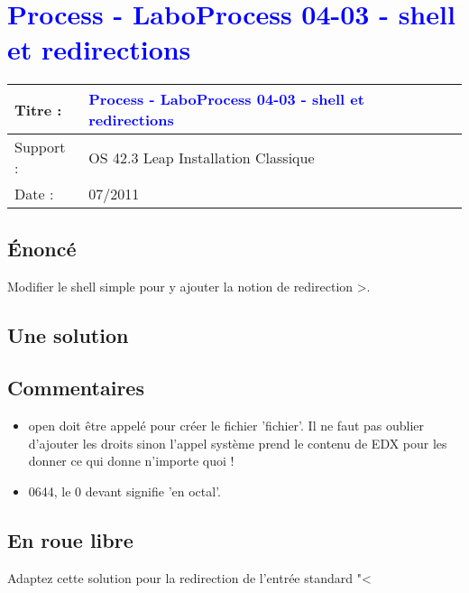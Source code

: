 \lstset{language=c}
\renewcommand{\titre}{\textcolor{blue}{ Process - LaboProcess 04-03 - shell et redirections }}

\lhead{ \titre }
\section{{\titre} }

\begin{tabular}{|l|l|}
\hline
Titre : 	& \titre \\\hline
Support : 	& OS 42.3 Leap Installation Classique \\\hline
Date :		& 07/2011 \\\hline
\end{tabular}

\subsection{Énoncé}

Modifier le shell simple pour y ajouter la notion de redirection >.

\subsection{Une solution}



\subsection{Commentaires}

\begin{itemize}
\item open doit être appelé pour créer le fichier 'fichier'. Il ne faut pas oublier d'ajouter les droits sinon l'appel système prend le contenu de EDX pour les donner ce qui donne n'importe quoi !
\item 0644, le 0 devant signifie 'en octal'.
\end{itemize}

\subsection{En roue libre}
Adaptez cette solution pour la redirection de l'entrée standard "<

\newpage
